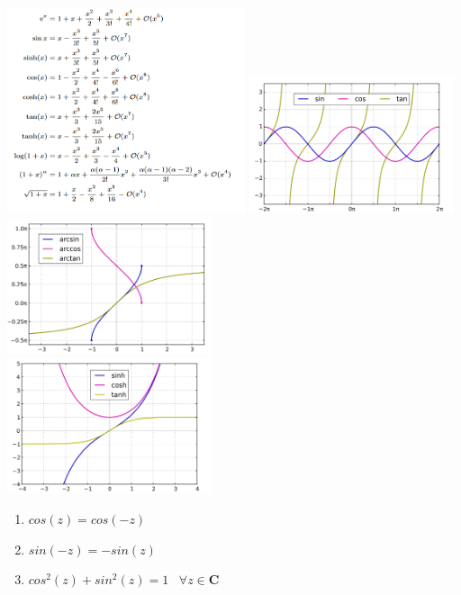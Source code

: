 \documentclass[8pt]{extarticle}
\begin{document}
\begin{multicols*}{3}
\includegraphics[width=7cm]{taylor.png}
\includegraphics[width=6cm]{sincostan.png}\\
\includegraphics[width=6cm]{arcsinArccosArctan.png}\\
\includegraphics[width=6cm]{sinhCoshTanh.png}


\begin{enumerate}
  \item $cos(z) = cos(-z)$
  \item $sin(-z) = -sin(z)$
  \item $cos^2(z) + sin^2(z) = 1 \;\;\; \forall z \in \mathbf{C}$
\end{enumerate}



\end{multicols*}
\end{document}
